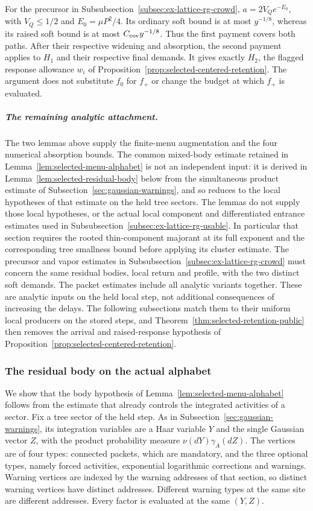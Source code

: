 For the precursor in Subsubsection~\ref{subsec:ex-lattice-rg-crowd},
$a=2V_Qe^{-E_0}$, with $V_Q\le1/2$ and
$E_0=\mu P^2/4$. Its ordinary soft bound is at most $y^{-1/8}$,
whereas its raised soft bound is at most
$C_{\rm cov}y^{-1/8}$. Thus the first payment covers both paths.
After their respective widening and absorption, the second payment
applies to $H_1$ and their respective final demands. It gives
exactly $H_2$, the flagged response allowance $w_i$ of
Proposition~\ref{prop:selected-centered-retention}. The argument
does not substitute $f_0$ for $f_+$ or change the budget at which
$f_+$ is evaluated.

\subparagraph{The remaining analytic attachment.}
The two lemmas above supply the finite-menu augmentation and the four
numerical absorption bounds. The common mixed-body estimate retained in
Lemma~\ref{lem:selected-menu-alphabet} is not an independent input: it
is derived in Lemma~\ref{lem:selected-residual-body} below from the
simultaneous product estimate of Subsection~\ref{sec:gaussian-warnings},
and so reduces to the local hypotheses of that estimate on the held
tree sectors. The lemmas do not supply those local hypotheses, or the
actual local component and differentiated entrance estimates used in
Subsubsection~\ref{subsec:ex-lattice-rg-usable}. In particular that section
requires the rooted thin-component majorant at its full exponent and
the corresponding tree smallness bound before applying its cluster
estimate. The precursor and vapor estimates in
Subsubsection~\ref{subsec:ex-lattice-rg-crowd} must concern the same residual
bodies, local return and profile, with the two distinct soft demands.
The packet estimates include all analytic variants together.
These are analytic inputs on the held local step, not additional
consequences of increasing the delays. The following subsections match
them to their uniform local producers on the stored steps, and
Theorem~\ref{thm:selected-retention-public} then removes the arrival
and raised-response hypothesis of
Proposition~\ref{prop:selected-centered-retention}.

\subsubsection{The residual body on the actual alphabet}
\label{sec:selected-residual-body}

We show that the body hypothesis of
Lemma~\ref{lem:selected-menu-alphabet} follows from the estimate that
already controls the integrated activities of a sector. Fix a tree
sector of the held step. As in Subsection~\ref{sec:gaussian-warnings},
its integration variables are a Haar variable $Y$ and the single
Gaussian vector $Z$, with the product probability measure
$\nu(dY)\gamma_A(dZ)$. The vertices are of four types: connected
packets, which are mandatory, and the three optional types, namely
forced activities, exponential logarithmic corrections and warnings.
Warning vertices are indexed by the warning addresses of that section,
so distinct warning vertices have distinct addresses. Different warning
types at the same site are different addresses. Every factor is evaluated at the same $(Y,Z)$.

